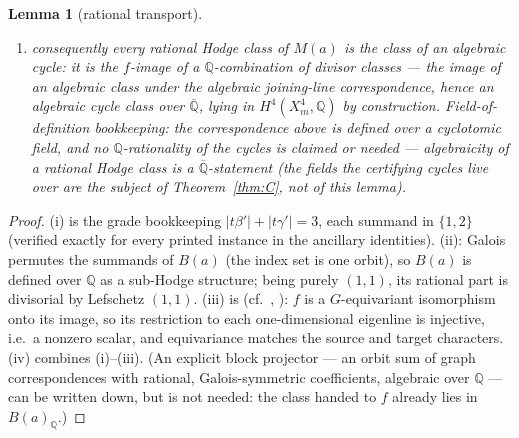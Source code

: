 \documentclass[11pt]{amsart}
\newtheorem{lemma}[theorem]{Lemma}
\theoremstyle{remark}
\newcommand{\Q}{\mathbb{Q}}
\newcommand{\V}{V}
\newcommand{\Qbar}{\overline{\Q}}
\begin{document}
\begin{lemma}[rational transport]
\begin{enumerate}
maps each one-dimensional eigenline $\V(t\beta')\otimes\V(t\gamma')$ isomorphically --- in
particular by a nonzero scalar --- onto $\V(ta)$, hence carries $B(a)$ onto the corresponding
block of $M(a)$. On decomposable \emph{algebraic} inputs $f(Z_1\otimes Z_2)=m\,Z_1\wedge Z_2$,
the ruled join by lines \cite[Thm.~2.2(c)]{daSilva}; this formula is used only for the geometric
description of the image cycles, not for the scalar on the $H^1$-eigenlines, which are not
spanned by algebraic classes;
\item[(iv)] consequently every rational Hodge class of $M(a)$ is the class of an algebraic cycle:
it is the $f$-image of a $\Q$-combination of divisor classes --- the image of an algebraic
class under the algebraic joining-line correspondence, hence an algebraic cycle class over
$\Qbar$, lying in $H^4(X^4_m,\Q)$ by construction.
Field-of-definition bookkeeping: the correspondence above is defined over a cyclotomic field, and
no $\Q$-rationality of the \emph{cycles} is claimed or needed --- algebraicity of a rational Hodge
class is a $\Qbar$-statement (the fields the certifying cycles live over are the subject of
Theorem~\ref{thm:C}, not of this lemma).
\end{enumerate}
\end{lemma}

\begin{proof}
(i) is the grade bookkeeping $|t\beta'|+|t\gamma'|=3$, each summand in $\{1,2\}$ (verified exactly
for every printed instance in the ancillary identities). (ii): Galois permutes the summands of
$B(a)$ (the index set is one orbit), so $B(a)$ is defined over $\Q$ as a sub-Hodge structure; being
purely $(1,1)$, its rational part is divisorial by Lefschetz $(1,1)$. (iii) is \cite[Thm.~2.2]{daSilva} (cf.\ \cite{Shioda79}, \cite[Thm.~1.7]{SK}): $f$ is a $G$-equivariant
isomorphism onto its image, so its restriction to each one-dimensional eigenline is injective,
i.e.\ a nonzero scalar, and equivariance matches the source and target characters. (iv)
combines (i)--(iii). (An explicit block projector --- an orbit sum of graph correspondences
with rational, Galois-symmetric coefficients, algebraic over $\Q$ --- can be written down, but
is not needed: the class handed to $f$ already lies in $B(a)_\Q$.)
\end{proof}
\end{document}
